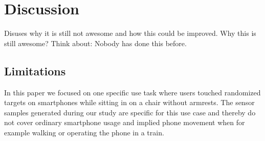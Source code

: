 \section{Discussion}
Disuses why it is still not awesome and how this could be improved. Why this is still awesome? Think about: Nobody has done this before. 

\subsection*{Limitations}
In this paper we focused on one specific use task where users touched randomized targets on smartphones while sitting in on a chair without armrests. 
The sensor samples generated during our study are specific for this use case and thereby do not cover ordinary smartphone usage and implied phone movement when for example walking or operating the phone in a train.
